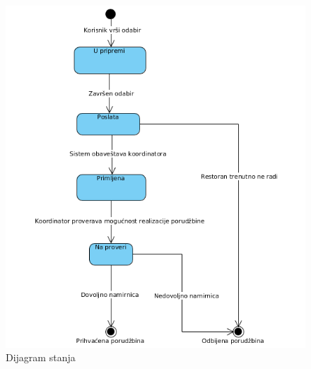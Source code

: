 \begin{figure}[ht]
    \leavevmode
    \begin{center}
    \includegraphics[height=0.6\textheight]{slike/Upravljanje_porudzbinom.png}
    \end{center}
    \caption{Dijagram stanja} %
    \label{fig:slika3}
\end{figure}


